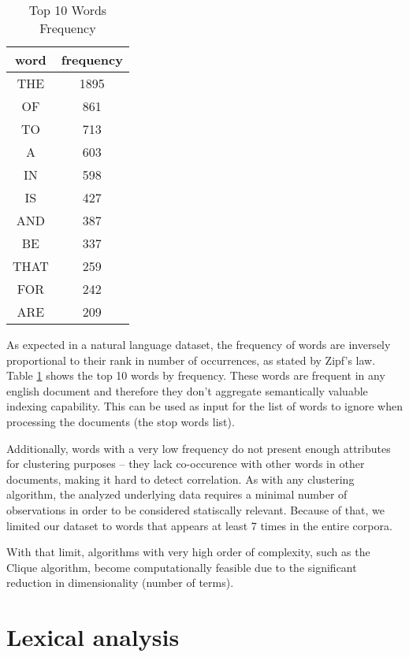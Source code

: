 \documentclass{article}
\begin{document}
\begin{table}
    \centering
    \begin{tabular}{|c|c|}
    \hline
    word & frequency \\ \hline
    THE & 1895 \\ \hline
    OF   & 861 \\ \hline
    TO   & 713 \\ \hline
    A    & 603 \\ \hline
    IN   & 598 \\ \hline
    IS   & 427 \\ \hline
    AND  & 387 \\ \hline
    BE   & 337 \\ \hline
    THAT & 259 \\ \hline
    FOR  & 242 \\ \hline
    ARE  & 209 \\ \hline
    \end{tabular}
    \caption{Top 10 Words Frequency}
    \label{tab:top10}
\end{table}

As expected in a natural language dataset, the frequency of words are inversely proportional to their rank in number of occurrences, as stated by Zipf's law\cite{manning1999foundations}. Table \ref{tab:top10} shows the top 10 words by frequency. These words are frequent in any english document and therefore they don't aggregate semantically valuable indexing capability. This can be used as input for the list of words to ignore when processing the documents (the stop words list).

Additionally, words with a very low frequency do not present enough attributes for clustering purposes -- they lack co-occurence with other words in other documents, making it hard to detect correlation. As with any clustering algorithm, the analyzed underlying data requires a minimal number of observations in order to be considered statiscally relevant. Because of that, we limited our dataset to words that appears at least 7 times in the entire corpora.

With that limit, algorithms with very high order of complexity, such as the Clique algorithm, become computationally feasible due to the significant reduction in dimensionality (number of terms).

\section{Lexical analysis}
\end{document}
